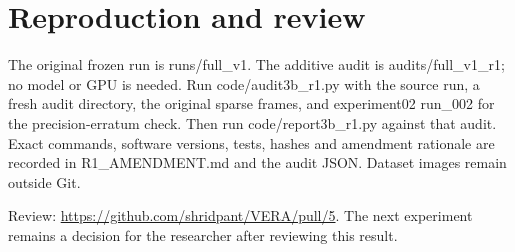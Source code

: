 \documentclass[10pt]{article}
\begin{document}
\section{Reproduction and review}
The original frozen run is runs/full\_v1. The additive audit is audits/full\_v1\_r1; no model or GPU is needed. Run code/audit3b\_r1.py with the source run, a fresh audit directory, the original sparse frames, and experiment02 run\_002 for the precision-erratum check. Then run code/report3b\_r1.py against that audit. Exact commands, software versions, tests, hashes and amendment rationale are recorded in R1\_AMENDMENT.md and the audit JSON. Dataset images remain outside Git.\par
Review: \url{https://github.com/shridpant/VERA/pull/5}. The next experiment remains a decision for the researcher after reviewing this result.
\end{document}

